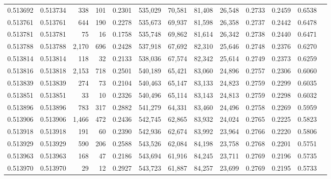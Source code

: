 \begin{tabular}{rrrrrrrrrrrrr}
0.513692 & 0.513734 &   338 &   101 &                                     0.2301 & 535,029 &  70,581 &  81,408 &  26,548 & 0.2733 & 0.2459 & 0.6538 \\
0.513761 & 0.513761 &   644 &   190 &                                     0.2278 & 535,673 &  69,937 &  81,598 &  26,358 & 0.2737 & 0.2442 & 0.6478 \\
0.513781 & 0.513781 &    75 &    16 &                                     0.1758 & 535,748 &  69,862 &  81,614 &  26,342 & 0.2738 & 0.2440 & 0.6471 \\
0.513788 & 0.513788 & 2,170 &   696 &                                     0.2428 & 537,918 &  67,692 &  82,310 &  25,646 & 0.2748 & 0.2376 & 0.6270 \\
0.513814 & 0.513814 &   118 &    32 &                                     0.2133 & 538,036 &  67,574 &  82,342 &  25,614 & 0.2749 & 0.2373 & 0.6259 \\
0.513816 & 0.513818 & 2,153 &   718 &                                     0.2501 & 540,189 &  65,421 &  83,060 &  24,896 & 0.2757 & 0.2306 & 0.6060 \\
0.513839 & 0.513839 &   274 &    73 &                                     0.2104 & 540,463 &  65,147 &  83,133 &  24,823 & 0.2759 & 0.2299 & 0.6035 \\
0.513851 & 0.513851 &    33 &    10 &                                     0.2326 & 540,496 &  65,114 &  83,143 &  24,813 & 0.2759 & 0.2298 & 0.6032 \\
0.513896 & 0.513896 &   783 &   317 &                                     0.2882 & 541,279 &  64,331 &  83,460 &  24,496 & 0.2758 & 0.2269 & 0.5959 \\
0.513906 & 0.513906 & 1,466 &   472 &                                     0.2436 & 542,745 &  62,865 &  83,932 &  24,024 & 0.2765 & 0.2225 & 0.5823 \\
0.513918 & 0.513918 &   191 &    60 &                                     0.2390 & 542,936 &  62,674 &  83,992 &  23,964 & 0.2766 & 0.2220 & 0.5806 \\
0.513929 & 0.513929 &   590 &   206 &                                     0.2588 & 543,526 &  62,084 &  84,198 &  23,758 & 0.2768 & 0.2201 & 0.5751 \\
0.513963 & 0.513963 &   168 &    47 &                                     0.2186 & 543,694 &  61,916 &  84,245 &  23,711 & 0.2769 & 0.2196 & 0.5735 \\
0.513970 & 0.513970 &    29 &    12 &                                     0.2927 & 543,723 &  61,887 &  84,257 &  23,699 & 0.2769 & 0.2195 & 0.5733 \\

\end{tabular}
